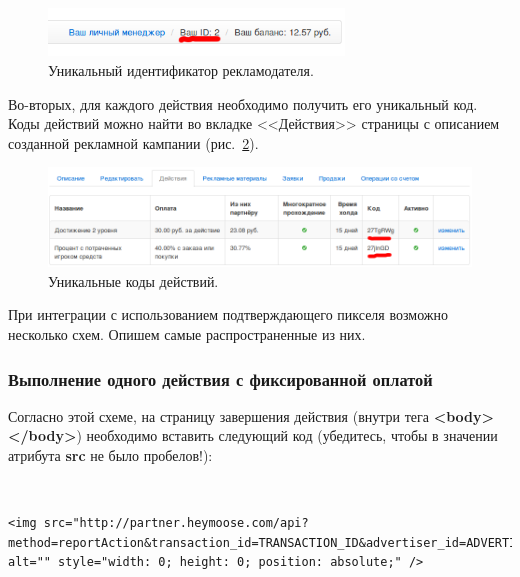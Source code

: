 \documentclass[a4paper,12pt]{article}
\begin{document}
\begin{figure}[!ht]
\centering
\includegraphics[width=0.7\textwidth]{include/advertiser-id.png}
\caption{Уникальный идентификатор рекламодателя.}
\label{fig:advertiser-id}
\end{figure}

Во-вторых, для каждого действия необходимо получить его уникальный код. Коды действий можно найти во вкладке <<Действия>> страницы с описанием созданной рекламной кампании (рис.~\ref{fig:suboffer-code}).

\begin{figure}[!ht]
\centering
\includegraphics[width=\textwidth]{include/suboffer-code.png}
\caption{Уникальные коды действий.}
\label{fig:suboffer-code}
\end{figure}

При интеграции с использованием подтверждающего пикселя возможно несколько схем. Опишем самые распространенные из них.

\subsubsection{Выполнение одного действия с фиксированной оплатой}

Согласно этой схеме, на страницу завершения действия (внутри тега \textbf{<body></body>}) необходимо вставить следующий код (убедитесь, чтобы в значении атрибута \textbf{src} не было пробелов!):

~\\

\begin{samepage}
\begin{lstlisting}[language=Pixel]
<img src="http://partner.heymoose.com/api?method=reportAction&transaction_id=TRANSACTION_ID&advertiser_id=ADVERTISER_ID&offer=OFFER_CODE" 
alt="" style="width: 0; height: 0; position: absolute;" />
\end{lstlisting}
\end{samepage}
\end{document}
